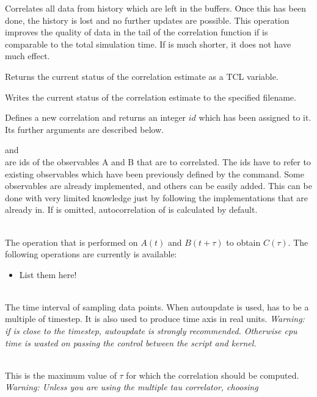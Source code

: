 Correlates all data from history which are left in the buffers. Once this 
has been done, the history is lost and no further updates are possible.
This operation improves the quality of data in the tail of the 
correlation function if  is comparable to the total
simulation time. If  is much shorter, it does not
have much effect.

Returns the current status of the correlation estimate as a TCL variable.

Writes the current status of the correlation estimate to the specified filename.

Defines a new correlation and returns an integer $id$ which has been assigned to it.
Its further arguments are described below.

\begin{arguments}
\item {} and  \\ 
  are ids of the observables A and B that are to correlated. The ids have to refer to existing 
  observables which have been previously defined by the  command.
  Some observables are already implemented, and others can be easily added. This can be done
  with very limited \es{} knowledge just by following the implementations that are already
  in. If  is omitted, autocorrelation of  is calculated by default.
\item {} \\
  The operation that is performed on $A(t)$ and $B(t+\tau)$ to obtain $C(\tau)$. 
  The following operations are currently is available:
  \begin{itemize}
    \item List them here! 
  \end{itemize}
\item {} \\
  The time interval of sampling data points. When autoupdate is used,  has
  to be a multiple of timestep. It is also used to produce time axis in real units.
  \textit{Warning: if  is close to the timestep, autoupdate is strongly recommended.
  Otherwise cpu time is wasted on passing the control between the script and kernel.}
\item {} \\
  This is the maximum value of $\tau$ for which the correlation should be computed.
  \textit{Warning: Unless you are using the multiple tau correlator, choosing 
}
\end{arguments}
